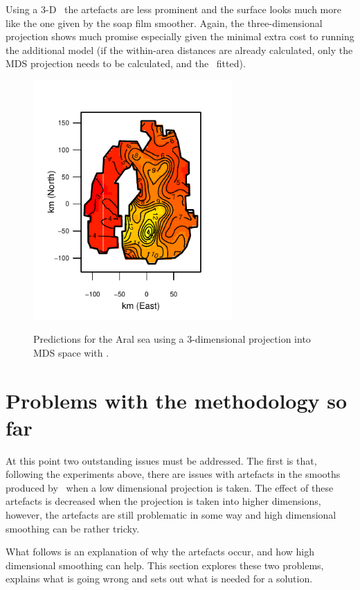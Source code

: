 Using a 3-D \tprs\ the artefacts are less prominent and the surface looks much more like the one given by the soap film smoother. Again, the three-dimensional projection shows much promise especially given the minimal extra cost to running the additional model (if the within-area distances are already calculated, only the MDS projection needs to be calculated, and the \tprs\ fitted).

\begin{figure}
\centering
\includegraphics[width=3in]{mds/figs/aral-3d.pdf} \\
\caption{Predictions for the Aral sea using a 3-dimensional projection into MDS space with \mdsap.}
\label{aral-fit-3d}
\end{figure}

\section{Problems with the methodology so far}
\label{mds-problems}

At this point two outstanding issues must be addressed. The first is that, following the experiments above, there are issues with artefacts in the smooths produced by \mdsap\ when a low dimensional projection is taken. The effect of these artefacts is decreased when the projection is taken into higher dimensions, however, the artefacts are still problematic in some way and high dimensional smoothing can be rather tricky. 

What follows is an explanation of why the artefacts occur, and how high dimensional smoothing can help. This section explores these two problems, explains what is going wrong and sets out what is needed for a solution.

